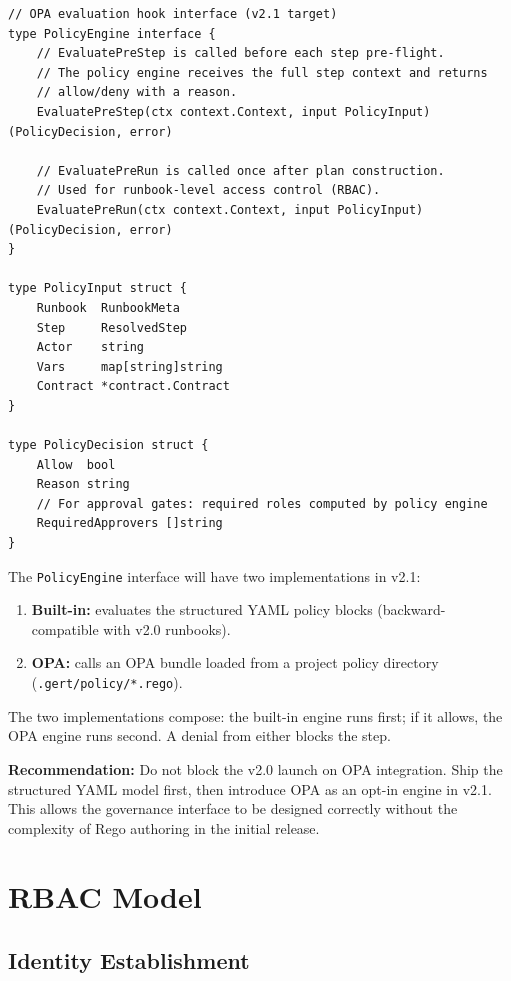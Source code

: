 \begin{verbatim}
// OPA evaluation hook interface (v2.1 target)
type PolicyEngine interface {
    // EvaluatePreStep is called before each step pre-flight.
    // The policy engine receives the full step context and returns
    // allow/deny with a reason.
    EvaluatePreStep(ctx context.Context, input PolicyInput) (PolicyDecision, error)

    // EvaluatePreRun is called once after plan construction.
    // Used for runbook-level access control (RBAC).
    EvaluatePreRun(ctx context.Context, input PolicyInput) (PolicyDecision, error)
}

type PolicyInput struct {
    Runbook  RunbookMeta
    Step     ResolvedStep
    Actor    string
    Vars     map[string]string
    Contract *contract.Contract
}

type PolicyDecision struct {
    Allow  bool
    Reason string
    // For approval gates: required roles computed by policy engine
    RequiredApprovers []string
}
\end{verbatim}

The \texttt{PolicyEngine} interface will have two implementations in v2.1:
\begin{enumerate}
  \item \textbf{Built-in:} evaluates the structured YAML policy blocks (backward-compatible
        with v2.0 runbooks).
  \item \textbf{OPA:} calls an OPA bundle loaded from a project policy directory
        (\texttt{.gert/policy/*.rego}).
\end{enumerate}

The two implementations compose: the built-in engine runs first; if it allows, the OPA engine
runs second. A denial from either blocks the step.

\textbf{Recommendation:} Do not block the v2.0 launch on OPA integration. Ship the structured
YAML model first, then introduce OPA as an opt-in engine in v2.1. This allows the governance
interface to be designed correctly without the complexity of Rego authoring in the initial release.

\section{RBAC Model}

\subsection{Identity Establishment}

